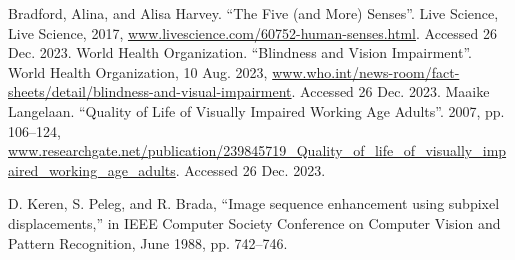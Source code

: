 
\begin{thebibliography}{99}

 Bradford, Alina, and Alisa Harvey. ``The Five (and More) Senses''. Live Science, Live Science, 2017, \url{www.livescience.com/60752-human-senses.html}. Accessed 26 Dec. 2023.
 World Health Organization. ``Blindness and Vision Impairment''. World Health Organization, 10 Aug. 2023, \url{www.who.int/news-room/fact-sheets/detail/blindness-and-visual-impairment}. Accessed 26 Dec. 2023.
 Maaike Langelaan. ``Quality of Life of Visually Impaired Working Age Adults''. 2007, pp. 106--124, \url{www.researchgate.net/publication/239845719_Quality_of_life_of_visually_impaired_working_age_adults}. Accessed 26 Dec. 2023.

 D. Keren, S. Peleg, and R. Brada, “Image sequence enhancement using subpixel
displacements,” in IEEE Computer Society Conference on Computer Vision and
Pattern Recognition, June 1988, pp. 742–746.

\end{thebibliography}